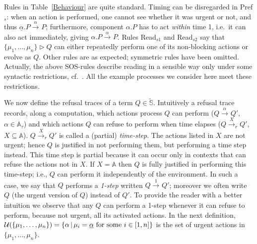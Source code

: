 \documentclass[copyright,creativecommons]{eptcs}
\def\name#1{\mbox{\sc #1}}
\newcommand{\nar}[2]{\xrightarrow{#1}_{#2}}
\newcommand{\ur}{{\cal U}}
\newcommand{\B}{{\mathbb A}} \newcommand{\Bt}{\B_{\tau}} \newcommand{\X}{{\cal X}}
\newcommand{\Sg}{\tilde{\SG}}
\newcommand{\SG}{{\mathbb S}}
\newcommand{\rop}{\triangleright}
\begin{document}
Rules in Table~\ref{Behaviour} are quite standard. Timing can be
disregarded in \name{Pref$_s$}: when an action is performed, one cannot see
whether it was urgent or not, and thus $\underline{\alpha}.P \nar{\alpha}{}
P$; furthermore, component $\alpha.P$ has to act {\em within} time 1, i.e.\
it can also act immediately, giving $\alpha.P \nar{\alpha}{}P$. Rules
\name{Read$_{s1}$} and \name{Read$_{s2}$} say that $\{\mu_1,\ldots, \mu_n\}
\rop Q$ can either repeatedly perform one of its non-blocking actions or
evolve as $Q$. Other rules are as expected; symmetric rules have been
omitted.
Actually, the above SOS-rules describe reading in a sensible way only under
some syntactic restrictions, cf.~\cite{CDV08tr}. All the example processes
we consider here meet these restrictions.


We now define the refusal traces of a term $Q \in \Sg$. Intuitively a
refusal trace records, along a computation, which actions process $Q$ can
perform ($Q \nar{\alpha}{} Q'$, $\alpha \in \Bt$) and which actions $Q$ can
refuse to perform when time elapses ($Q\nar{X}{r} Q'$, $X \subseteq \B$).
$Q \nar{X}{r} Q'$ is called a (partial) {\it time-step}. The actions listed
in $X$ are not urgent; hence $Q$ is justified in not performing them, but
performing a time step instead. This time step is partial because it can
occur only in contexts that can refuse the actions not in $X$. If $X = \B$
then $Q$ is fully justified in performing this time-step; i.e., $Q$ can
perform it independently of the environment. In such a case, we say that
$Q$ performs a {\it 1-step} written $Q \nar{1}{}Q'$; moreover we often
write $\underline{Q}$ (the urgent version of $Q$) instead of $Q'$. To
provide the reader with a better intuition we observe that any $Q$ can
perform a 1-step whenever it can refuse to perform, because not urgent, all
its activated actions. In the next definition, $\ur(\{\mu_1, \ldots,
\mu_n\}) =  \{\alpha \,|\, \mu_i = \underline{\alpha} \mbox{ for some } i
\in [1,n]\}$ is the set of urgent actions in $\{\mu_1,\ldots,\mu_n\}$. 
\end{document}
